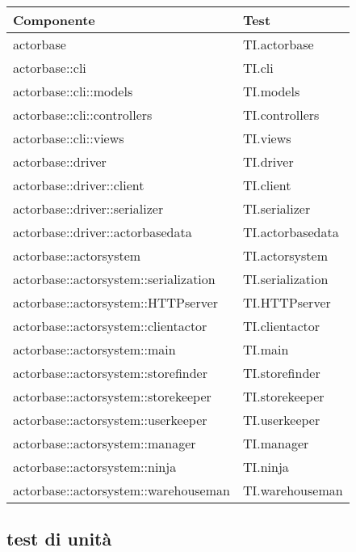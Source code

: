 \documentclass{scalatekids-article}
\begin{document}
\begin{longtable}[H]{| p{10cm} | l |}
  \hline
  Componente & Test\\
  \hline
  actorbase & TI.actorbase\\
  \hline
  actorbase::cli & TI.cli\\
  \hline
  actorbase::cli::models & TI.models\\
  \hline
  actorbase::cli::controllers & TI.controllers\\
  \hline
  actorbase::cli::views & TI.views\\
  \hline
  actorbase::driver & TI.driver\\
  \hline
  actorbase::driver::client & TI.client\\
  \hline
  actorbase::driver::serializer & TI.serializer\\
  \hline
  actorbase::driver::actorbasedata & TI.actorbasedata\\
  \hline
  actorbase::actorsystem & TI.actorsystem\\
  \hline
  actorbase::actorsystem::serialization & TI.serialization\\
  \hline
  actorbase::actorsystem::HTTPserver & TI.HTTPserver\\
  \hline
  actorbase::actorsystem::clientactor & TI.clientactor\\
  \hline
  actorbase::actorsystem::main & TI.main\\
  \hline
  actorbase::actorsystem::storefinder & TI.storefinder\\
  \hline
  actorbase::actorsystem::storekeeper & TI.storekeeper\\
  \hline
  actorbase::actorsystem::userkeeper & TI.userkeeper\\
  \hline
  actorbase::actorsystem::manager & TI.manager\\
  \hline
  actorbase::actorsystem::ninja & TI.ninja\\
  \hline
  actorbase::actorsystem::warehouseman & TI.warehouseman\\
  \hline
\end{longtable}

\subsection{test di unità}
\end{document}
